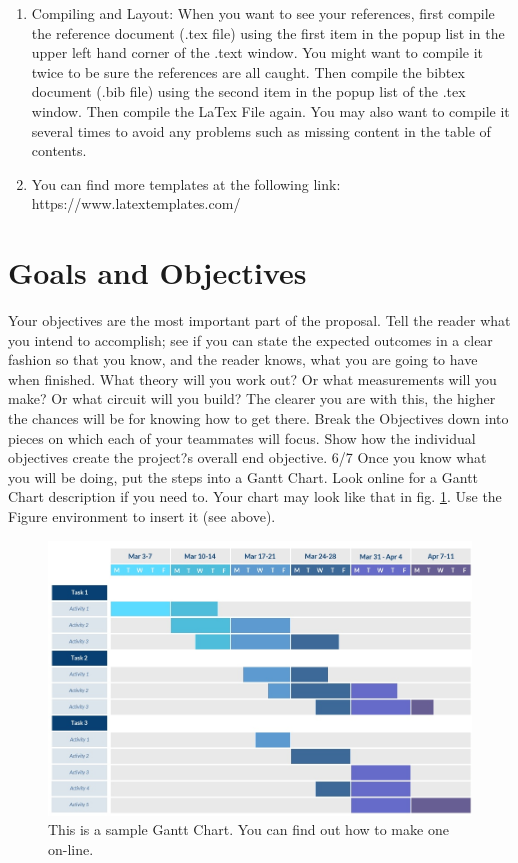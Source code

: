 \documentclass[ a4paper, 12pt, oneside ]{article} %
\begin{document}
{\begin{enumerate}
\item{ Compiling and Layout: When you want to see your references, first compile the reference document (.tex file) using the first item in the popup list in the upper left hand corner of the .text window. You might want to compile it twice to be sure the references are all caught. Then compile the bibtex document (.bib file) using the second item in the popup list of the .tex window. Then compile the LaTex File again. You may also want to compile it several times to avoid any problems such as missing content in the table of contents.}

\item{ You can find more templates at the following link: \\
https://www.latextemplates.com/}
\end{enumerate}

\section{Goals and Objectives} \label{goals}
Your objectives are the most important part of the proposal. Tell the reader what you intend to accomplish; see if you can state the expected outcomes in a clear fashion so that you know, and the reader knows, what you are going to have when finished. What theory will you work out? Or what measurements will you make? Or what circuit will you build? The clearer you are with this, the higher the chances will be for knowing how to get there.
Break the Objectives down into pieces on which each of your teammates will focus. Show how the individual objectives create the project?s overall end objective.
 6/7
 Once you know what you will be doing, put the steps into a Gantt Chart. Look online for a Gantt Chart description if you need to. Your chart may look like that in fig. \ref{Fig:GanttChart}. Use the Figure environment to insert it (see above).

\begin{figure}[h] 
\centering
\includegraphics[width=\textwidth]{SampleGanttChart.png} 
\caption{This is a sample Gantt Chart. You can find out how to make one on-line.}
\label{Fig:GanttChart}
\end{figure} 
 
}
\end{document}
